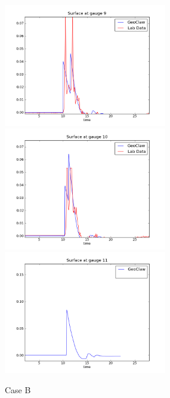 \begin{figure}[ht]
\hfil\includegraphics[width=2.8in]{bp5/CaseB/gauge0009fig300.png}\hfil
\vskip 5pt
\hfil\includegraphics[width=2.8in]{bp5/CaseB/gauge0010fig300.png}\hfil
\hfil\includegraphics[width=2.8in]{bp5/CaseB/gauge0011fig300.png}\hfil
\caption{\label{fig:bp5B} Case B }
\end{figure}

